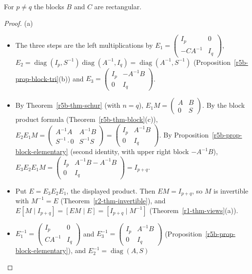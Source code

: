 \documentclass[12pt]{article}
\DeclareMathOperator{\diag}{diag}
\theoremstyle{definition}
\begin{document}
For \(p\ne q\) the blocks \(B\) and \(C\) are rectangular.
\begin{proof}
(a)
\begin{itemize}
\item The three steps are the left multiplications by
\(E_1=\left(\begin{smallmatrix}I_p&0\\-CA^{-1}&I_q\end{smallmatrix}\right)\),
\(E_2=\diag(I_p,S^{-1})\diag(A^{-1},I_q)=\diag(A^{-1},S^{-1})\) (Proposition~\ref{r5b-prop-block-tri}(b))
and \(E_3=\left(\begin{smallmatrix}I_p&-A^{-1}B\\0&I_q\end{smallmatrix}\right)\).
\item By Theorem~\ref{r5b-thm-schur} (with \(n=q\)),
\(E_1M=\left(\begin{smallmatrix}A&B\\0&S\end{smallmatrix}\right)\). By the block product formula
(Theorem~\ref{r5b-thm-block}(c)),
\(E_2E_1M=\left(\begin{smallmatrix}A^{-1}A&A^{-1}B\\S^{-1}\cdot0&S^{-1}S\end{smallmatrix}\right)
=\left(\begin{smallmatrix}I_p&A^{-1}B\\0&I_q\end{smallmatrix}\right)\). By
Proposition~\ref{r5b-prop-block-elementary} (second identity, with upper right block \(-A^{-1}B\)),
\(E_3E_2E_1M=\left(\begin{smallmatrix}I_p&A^{-1}B-A^{-1}B\\0&I_q\end{smallmatrix}\right)=I_{p+q}\).
\item Put \(E=E_3E_2E_1\), the displayed product. Then \(EM=I_{p+q}\), so \(M\) is invertible with
\(M^{-1}=E\) (Theorem~\ref{r2-thm-invertible}), and
\(E[M\mid I_{p+q}]=[EM\mid E]=[I_{p+q}\mid M^{-1}]\) (Theorem~\ref{r1-thm-views}(a)).
\item \(E_1^{-1}=\left(\begin{smallmatrix}I_p&0\\CA^{-1}&I_q\end{smallmatrix}\right)\) and
\(E_3^{-1}=\left(\begin{smallmatrix}I_p&A^{-1}B\\0&I_q\end{smallmatrix}\right)\)
(Proposition~\ref{r5b-prop-block-elementary}), and \(E_2^{-1}=\diag(A,S)\)

\end{itemize}
\end{proof}
\end{document}
